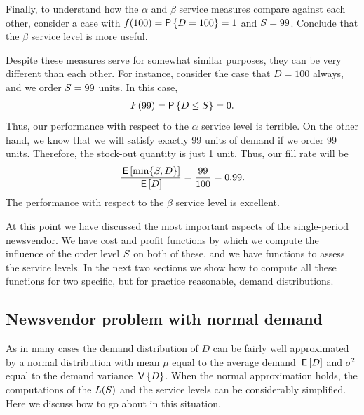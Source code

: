 \begin{exercise}
Finally, to understand how the $\alpha$ and $\beta$ service measures compare against each other, consider a case with $f(100)=\P{D=100}=1$ and $S=99$. Conclude that the $\beta$ service level is more useful.
\begin{solution}
Despite these measures serve for somewhat similar purposes, they can be very different than each other. For instance, consider the case that $D=100$ always, and we order $S=99$ units. 
In this case, 
\begin{align*}
F(99) = \P{D\leq \Q} = 0.
\end{align*}
Thus, our performance with respect to the $\alpha$ service level is terrible.
On the other hand, we know that we will satisfy exactly 99 units of demand if we order 99 units. Therefore, the stock-out  quantity is just 1 unit. Thus, our fill rate will be 
\begin{align*}
\frac{\,\mathsf{E}\left[\min\{S,D\}\right]}{\,\mathsf{E}\left[D\right]} = \frac{99}{100} = 0.99.
\end{align*}
The performance with respect to the $\beta$ service level is excellent.
\end{solution}
\end{exercise}

At this point we have discussed the most important aspects of the single-period newsvendor. We have cost and profit functions by which we compute the influence of the order level $S$ on both of these, and we have functions to assess the service levels. In the next two sections we show how to compute all these functions for two specific, but for practice reasonable, demand distributions. 


\subsection{Newsvendor problem with normal demand}

As in many cases the demand distribution of $D$ can be fairly well approximated by a normal distribution with mean $\mu$ equal to the average demand $\,\mathsf{E}\left[D\right]$ and $\sigma^2$ equal to the demand variance $\,\mathsf{V}\left\{D\right\}$. When the normal approximation holds, the computations of the $L(S)$ and the service levels can be considerably simplified. Here we discuss how to go about in this situation. 


